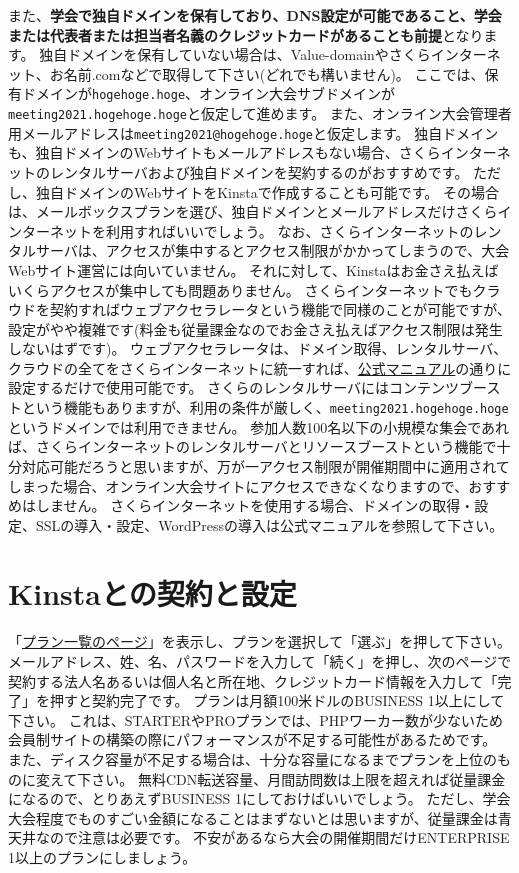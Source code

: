 \documentclass[titlepage,10pt,a4paper,uplatex]{jsbook}
\renewcommand{\textbf}[1]{{\bfseries\sffamily#1}}
\begin{document}
また、\textbf{学会で独自ドメインを保有しており、DNS設定が可能であること、学会または代表者または担当者名義のクレジットカードがあることも前提}となります。
独自ドメインを保有していない場合は、Value-domainやさくらインターネット、お名前.comなどで取得して下さい(どれでも構いません)。
ここでは、保有ドメインが\texttt{hogehoge.hoge}、オンライン大会サブドメインが\texttt{meeting2021.hogehoge.hoge}と仮定して進めます。
また、オンライン大会管理者用メールアドレスは\texttt{meeting2021@hogehoge.hoge}と仮定します。
独自ドメインも、独自ドメインのWebサイトもメールアドレスもない場合、さくらインターネットのレンタルサーバおよび独自ドメインを契約するのがおすすめです。
ただし、独自ドメインのWebサイトをKinstaで作成することも可能です。
その場合は、メールボックスプランを選び、独自ドメインとメールアドレスだけさくらインターネットを利用すればいいでしょう。
なお、さくらインターネットのレンタルサーバは、アクセスが集中するとアクセス制限がかかってしまうので、大会Webサイト運営には向いていません。
それに対して、Kinstaはお金さえ払えばいくらアクセスが集中しても問題ありません。
さくらインターネットでもクラウドを契約すればウェブアクセラレータという機能で同様のことが可能ですが、設定がやや複雑です(料金も従量課金なのでお金さえ払えばアクセス制限は発生しないはずです)。
ウェブアクセラレータは、ドメイン取得、レンタルサーバ、クラウドの全てをさくらインターネットに統一すれば、\href{https://manual.sakura.ad.jp/cloud/webaccel/manual/tips-settings-webaccel-for-rs.html}{公式マニュアル}の通りに設定するだけで使用可能です。
さくらのレンタルサーバにはコンテンツブーストという機能もありますが、利用の条件が厳しく、\texttt{meeting2021.hogehoge.hoge}というドメインでは利用できません。
参加人数100名以下の小規模な集会であれば、さくらインターネットのレンタルサーバとリソースブーストという機能で十分対応可能だろうと思いますが、万が一アクセス制限が開催期間中に適用されてしまった場合、オンライン大会サイトにアクセスできなくなりますので、おすすめはしません。
さくらインターネットを使用する場合、ドメインの取得・設定、SSLの導入・設定、WordPressの導入は公式マニュアルを参照して下さい。

\section{Kinstaとの契約と設定}

「\href{https://kinsta.com/jp/plans/}{プラン一覧のページ}」を表示し、プランを選択して「選ぶ」を押して下さい。
メールアドレス、姓、名、パスワードを入力して「続く」を押し、次のページで契約する法人名あるいは個人名と所在地、クレジットカード情報を入力して「完了」を押すと契約完了です。
プランは月額100米ドルのBUSINESS 1以上にして下さい。
これは、STARTERやPROプランでは、PHPワーカー数が少ないため会員制サイトの構築の際にパフォーマンスが不足する可能性があるためです。
また、ディスク容量が不足する場合は、十分な容量になるまでプランを上位のものに変えて下さい。
無料CDN転送容量、月間訪問数は上限を超えれば従量課金になるので、とりあえずBUSINESS 1にしておけばいいでしょう。
ただし、学会大会程度でものすごい金額になることはまずないとは思いますが、従量課金は青天井なので注意は必要です。
不安があるなら大会の開催期間だけENTERPRISE 1以上のプランにしましょう。
\end{document}
